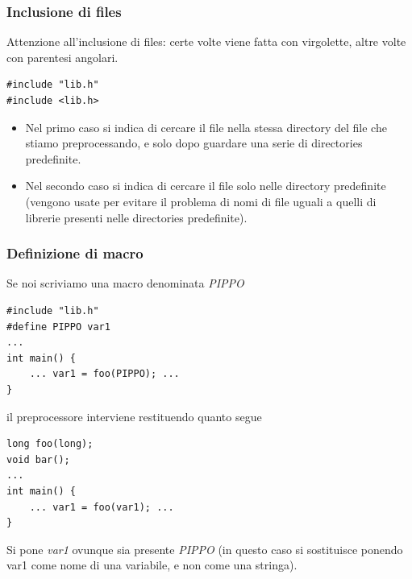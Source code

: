 \documentclass[11pt]{report}
\theoremstyle{definition}
\begin{document}
\subsubsection{Inclusione di files} Attenzione all'inclusione di files: certe volte viene fatta con virgolette, altre volte con parentesi angolari.
\begin{verbatim}
#include "lib.h"
#include <lib.h>
\end{verbatim}
\begin{itemize}
\item Nel primo caso si indica di cercare il file nella stessa directory del file che stiamo preprocessando, e solo dopo guardare una serie di directories predefinite.
\item Nel secondo caso si indica di cercare il file solo nelle directory predefinite (vengono usate per evitare il problema di nomi di file uguali a quelli di librerie presenti nelle directories predefinite).
\end{itemize}
\subsubsection{Definizione di macro}
Se noi scriviamo una macro denominata \emph{PIPPO}
\begin{verbatim}
#include "lib.h"
#define PIPPO var1
...
int main() {
    ... var1 = foo(PIPPO); ...
}
\end{verbatim}
il preprocessore interviene restituendo quanto segue
\begin{verbatim}
long foo(long);
void bar();
...
int main() {
    ... var1 = foo(var1); ...
}
\end{verbatim}
Si pone \emph{var1} ovunque sia presente \emph{PIPPO} (in questo caso si sostituisce ponendo var1 come nome di una variabile, e non come una stringa).
\end{document}
